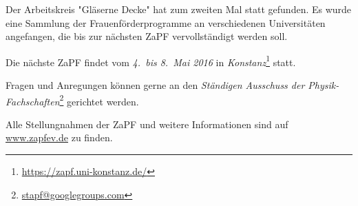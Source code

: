 Der Arbeitskreis "Gläserne Decke" hat zum zweiten Mal statt gefunden. Es wurde eine Sammlung der Frauenförderprogramme an verschiedenen Universitäten angefangen, die bis zur nächsten ZaPF vervollständigt werden soll.

\vspace{0.5cm}

Die nächste ZaPF findet vom \emph{4.\ bis 8.\ Mai 2016} in \emph{Konstanz}\footnote{\href{https://zapf.uni-konstanz.de/}{\url{https://zapf.uni-konstanz.de/}}} statt.

Fragen und Anregungen können gerne an den \emph{Ständigen Ausschuss der Physik-Fachschaften}\footnote{\href{mailto:stapf@googlegroups.com}{\url{stapf@googlegroups.com}}} gerichtet werden.

Alle Stellungnahmen der ZaPF und weitere Informationen sind auf \href{http://www.zapfev.de}{\url{www.zapfev.de}} zu finden.

